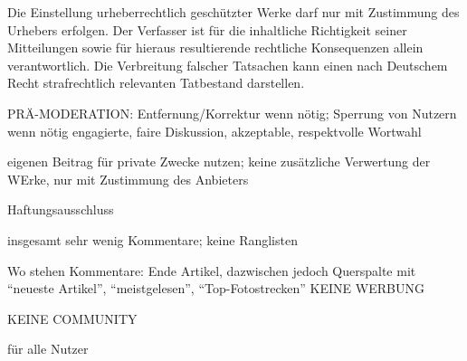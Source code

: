 Die Einstellung urheberrechtlich geschützter Werke darf nur mit Zustimmung des Urhebers erfolgen. Der Verfasser ist für die inhaltliche Richtigkeit seiner Mitteilungen sowie für hieraus resultierende rechtliche Konsequenzen allein verantwortlich. Die Verbreitung falscher Tatsachen kann einen nach Deutschem Recht strafrechtlich relevanten Tatbestand darstellen.

PRÄ-MODERATION:
Entfernung/Korrektur wenn nötig; Sperrung von Nutzern wenn nötig
engagierte, faire Diskussion, akzeptable, respektvolle Wortwahl


eigenen Beitrag für private Zwecke nutzen; keine zusätzliche Verwertung der WErke, nur mit Zustimmung des Anbieters

Haftungsausschluss

insgesamt sehr wenig Kommentare; keine Ranglisten

Wo stehen Kommentare: Ende Artikel, dazwischen jedoch Querspalte mit ``neueste Artikel'', ``meistgelesen'', ``Top-Fotostrecken'' KEINE WERBUNG

KEINE COMMUNITY

für alle Nutzer